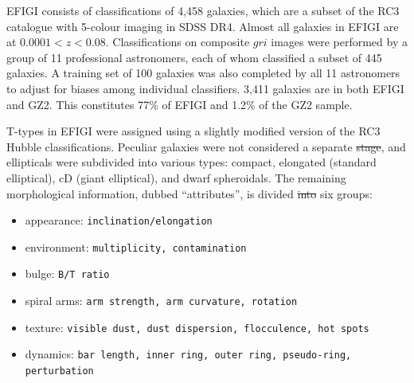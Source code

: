 \documentclass[useAMS,usenatbib]{mn2e}
\providecommand{\DIFaddtex}[1]{{\protect\color{blue}\uwave{#1}}} %
\providecommand{\DIFdeltex}[1]{{\protect\color{red}\sout{#1}}}                      %
\providecommand{\DIFaddbegin}{} %
\providecommand{\DIFaddend}{} %
\providecommand{\DIFdelbegin}{} %
\providecommand{\DIFdelend}{} %
\providecommand{\DIFadd}[1]{\texorpdfstring{\DIFaddtex{#1}}{#1}} %
\providecommand{\DIFdel}[1]{\texorpdfstring{\DIFdeltex{#1}}{}} %
\begin{document}

EFIGI consists of classifications of 4,458 galaxies, which are a subset of the RC3 catalogue with 5-colour imaging in SDSS DR4. Almost all galaxies in EFIGI are at $0.0001<z<0.08$. Classifications on composite $gri$ images were performed by a group of 11 professional astronomers, each of whom classified a subset of 445 galaxies. A training set of 100 galaxies was also completed by all 11 astronomers to adjust for biases among individual classifiers. 3,411 galaxies are in both EFIGI and GZ2. This constitutes 77\% of EFIGI and 1.2\% of the GZ2 sample. 

T-types in EFIGI were assigned using a slightly modified version of the RC3 Hubble classifications. Peculiar galaxies were not considered a separate \DIFdelbegin \DIFdel{stage}\DIFdelend \DIFaddbegin \DIFadd{type}\DIFaddend , and ellipticals were subdivided into various types: compact, elongated (standard elliptical), cD (giant elliptical), and dwarf spheroidals. The remaining morphological information, dubbed ``attributes'', is divided \DIFdelbegin \DIFdel{into }\DIFdelend \DIFaddbegin \DIFadd{between }\DIFaddend six groups:

\begin{itemize}
	\item appearance: {\tt inclination/elongation }
	\item environment: {\tt multiplicity, contamination}
	\item bulge: {\tt B/T ratio}
	\item spiral arms: {\tt arm strength, arm curvature, rotation}
	\item texture: {\tt visible dust, dust dispersion, flocculence, hot spots}
	\item dynamics: {\tt bar length, inner ring, outer ring, pseudo-ring, perturbation}
\end{itemize}
\end{document}
